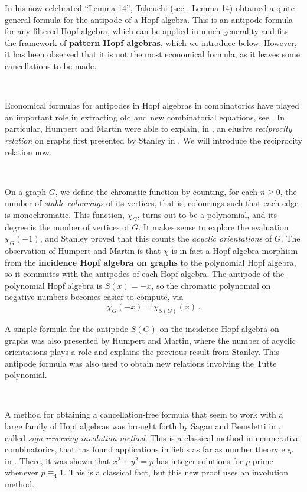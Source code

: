 \documentclass[12pt, reqno]{amsart}
\theoremstyle{definition}
\begin{document}
In his now celebrated  ``Lemma 14'', Takeuchi (see \cite{Takeuchi1971}, Lemma 14) obtained a quite general formula for the antipode of a Hopf algebra. 
This is an antipode formula for any filtered Hopf algebra, which can be applied in much generality and fits the framework of \textbf{pattern Hopf algebras}, which we introduce below.
However, it has been observed that it is not the most economical formula, as it leaves some cancellations to be made.

\

Economical formulas for antipodes in Hopf algebras in combinatorics have played an important role in extracting old and new combinatorial equations, see \cite{Schmitt1993, humpert2012incidence, BS2017, aguiar2017hopf, xu2022cancellation}.
In particular, Humpert and Martin were able to explain, in \cite{humpert2012incidence}, an elusive \textit{reciprocity relation} on graphs first presented by Stanley in \cite{stanley1975combinatorial}.
We will introduce the reciprocity relation now.

\

On a graph $G$, we define the chromatic function by counting, for each $n\geq 0$, the number of \textit{stable colourings} of its vertices, that is, colourings such that each edge is monochromatic.
This function, $\chi_G$, turns out to be a polynomial, and its degree is the number of vertices of $G$.
It makes sense to explore the evaluation $\chi_G(-1)$, and Stanley proved that this counts the \textit{acyclic orientations} of $G$.
The observation of Humpert and Martin is that $\chi$ is in fact a Hopf algebra morphism from the \textbf{incidence Hopf algebra on graphs} to the polynomial Hopf algebra, so it commutes with the antipodes of each Hopf algebra.
The antipode of the polynomial Hopf algebra is $S(x) = -x$, so the chromatic polynomial on negative numbers becomes easier to compute, via
$$\chi_G(-x) = \chi_{S(G)}(x)\, .$$

A simple formula for the antipode $S(G)$ on the incidence Hopf algebra on graphs was also presented by Humpert and Martin, where the number of acyclic orientations plays a role and explains the previous result from Stanley.
This antipode formula was also used to obtain new relations involving the Tutte polynomial.

\

A method for obtaining a cancellation-free formula that seem to work with a large family of Hopf algebras was brought forth by Sagan and Benedetti in \cite{BS2017}, called \textit{sign-reversing involution method}.
This is a classical method in enumerative combinatorics, that has found applications in fields as far as number theory e.g. in \cite{zagier2009one}.
There, it was shown that $x^2+y^2 = p$ has integer solutions for $p$ prime whenever $p\equiv_4 1$.
This is a classical fact, but this new proof uses an involution method.
\end{document}

